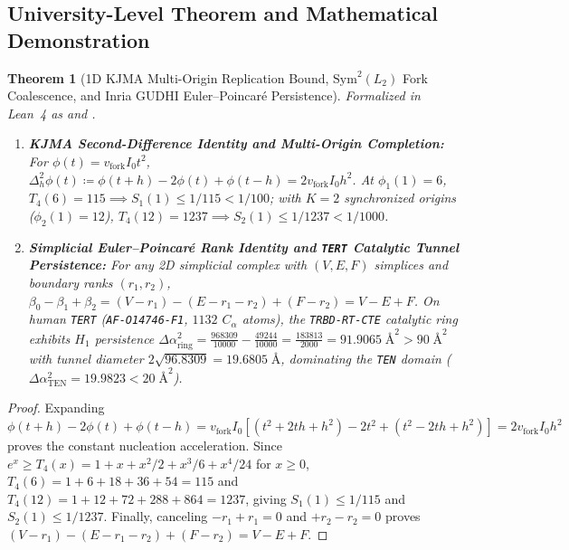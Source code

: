 \documentclass[11pt,a4paper]{article}
\newtheorem{theorem}{Theorem}[section]
\theoremstyle{definition}
\theoremstyle{remark}
\begin{document}
\subsection{University-Level Theorem and Mathematical Demonstration}

\begin{theorem}[1D KJMA Multi-Origin Replication Bound, $\mathrm{Sym}^2(L_2)$ Fork Coalescence, and Inria GUDHI Euler--Poincar\'e Persistence]
\label{thm:sec8_kjma_gudhi}
Formalized in Lean~4 as  and .
\begin{enumerate}
  \item \textbf{KJMA Second-Difference Identity and Multi-Origin Completion:} For $\phi(t) = v_{\mathrm{fork}} I_0 t^2$, $\Delta_h^2\phi(t) \coloneqq \phi(t+h) - 2\phi(t) + \phi(t-h) = 2 v_{\mathrm{fork}} I_0 h^2$. At $\phi_1(1) = 6$, $T_4(6) = 115 \implies S_1(1) \le 1/115 < 1/100$; with $K = 2$ synchronized origins ($\phi_2(1) = 12$), $T_4(12) = 1237 \implies S_2(1) \le 1/1237 < 1/1000$.
  \item \textbf{Simplicial Euler--Poincar\'e Rank Identity and \texttt{TERT} Catalytic Tunnel Persistence:} For any 2D simplicial complex with $(V, E, F)$ simplices and boundary ranks $(r_1, r_2)$, $\beta_0 - \beta_1 + \beta_2 = (V - r_1) - (E - r_1 - r_2) + (F - r_2) = V - E + F$. On human \texttt{TERT} (\texttt{AF-O14746-F1}, $1132$ $C_\alpha$ atoms), the \texttt{TRBD-RT-CTE} catalytic ring exhibits $H_1$ persistence $\Delta\alpha_{\mathrm{ring}}^2 = \frac{968309}{10000} - \frac{49244}{10000} = \frac{183813}{2000} = 91.9065\;\text{\AA}^2 > 90\;\text{\AA}^2$ with tunnel diameter $2\sqrt{96.8309} = 19.6805\;\text{\AA}$, dominating the \texttt{TEN} domain ($\Delta\alpha_{\mathrm{TEN}}^2 = 19.9823 < 20\;\text{\AA}^2$).
\end{enumerate}
\end{theorem}

\begin{proof}
Expanding $\phi(t+h) - 2\phi(t) + \phi(t-h) = v_{\mathrm{fork}} I_0 [(t^2 + 2th + h^2) - 2t^2 + (t^2 - 2th + h^2)] = 2 v_{\mathrm{fork}} I_0 h^2$ proves the constant nucleation acceleration. Since $e^x \ge T_4(x) = 1 + x + x^2/2 + x^3/6 + x^4/24$ for $x \ge 0$, $T_4(6) = 1 + 6 + 18 + 36 + 54 = 115$ and $T_4(12) = 1 + 12 + 72 + 288 + 864 = 1237$, giving $S_1(1) \le 1/115$ and $S_2(1) \le 1/1237$. Finally, canceling $-r_1 + r_1 = 0$ and $+r_2 - r_2 = 0$ proves $(V - r_1) - (E - r_1 - r_2) + (F - r_2) = V - E + F$.
\end{proof}
\end{document}
